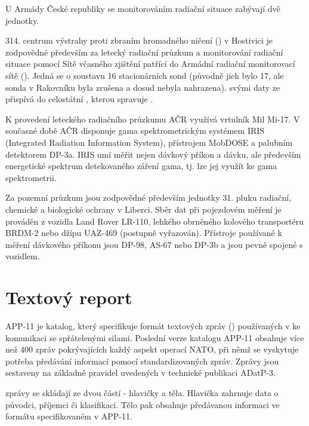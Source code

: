 U Armády České republiky se monitorováním radiační situace zabývají
dvě jednotky.
	 
314. centrum výstrahy proti zbraním hromadného ničení () v
Hostivici je zodpovědné především za letecký radiační průzkum a
monitorování radiační situace pomocí Sítě včasného zjištění patřící do
Armádní radiační monitorovací sítě (). Jedná se o
soustavu 16 stacionárních sond (původně jich bylo 17, ale sonda v
Rakovníku byla zrušena a dosud nebyla nahrazena).  svými daty
ze  přispívá do celostátní , kterou spravuje
.
	 
K provedení leteckého radiačního průzkumu AČR využívá vrtulník Mil
Mi-17. V současné době AČR disponuje gama spektrometrickým systémem
IRIS (Integrated Radiation Information System), přístrojem MobDOSE a
palubním detektorem DP-3a. IRIS umí měřit nejen dávkový příkon a
dávku, ale především energetické spektrum detekovaného záření gama,
tj. lze jej využít ke gama spektrometrii.
	
Za pozemní průzkum jsou zodpovědné především jednotky 31. pluku
radiační, chemické a biologické ochrany v Liberci. Sběr dat při
pojezdovém měření je prováděn z vozidla Land Rover LR-110, lehkého
obrněného kolového transportéru BRDM-2 nebo džípu UAZ-469 (postupně
vyřazován). Přístroje používané k měření dávkového příkonu jsou DP-98,
AS-67 nebo DP-3b a jsou pevně spojené s vozidlem.
	 
	 
\section{Textový report}

APP-11 je katalog, který specifikuje formát textových zpráv ()
používaných v  ke komunikaci se spřátelenými silami. Poslední
verze katalogu APP-11 obsahuje více než 400 zpráv pokrývajících každý
aspekt operací NATO, při němž se vyskytuje potřeba předávání informací
pomocí standardizovaných zpráv. Zprávy jsou sestaveny na základně
pravidel uvedených v technické publikaci ADatP-3.

 zprávy se skládají ze dvou částí - hlavičky a těla. Hlavička
zahrnuje data o původci, příjemci či klasifikaci. Tělo pak obsahuje
předávanou informaci ve formátu specifikovaném v APP-11.

